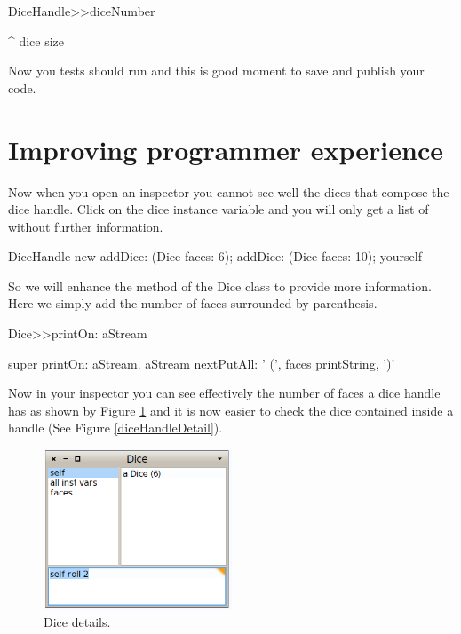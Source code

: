 \documentclass[a4paper,10pt,twoside]{book}
\begin{document}
\begin{code}{}
DiceHandle>>diceNumber  

	^ dice size
\end{code}


Now you tests should run and this is good moment to save and publish your code. 
\section{ Improving programmer experience}
Now when you open an inspector you cannot see well the dices that compose the dice handle. Click on the dice instance variable and you will only get a list of  without further information. 


\begin{code}{}
DiceHandle new 
	addDice: (Dice faces: 6);
	addDice: (Dice faces: 10);
	yourself
\end{code}


So we will enhance the  method of the Dice class to provide more information. Here we simply add the number of faces surrounded by parenthesis.


\begin{code}{}
Dice>>printOn: aStream

	super printOn: aStream.
	aStream nextPutAll: ' (', faces printString, ')'
\end{code}


Now in your inspector you can see effectively the number of faces a dice handle has as shown by Figure \ref{diceDetail} and it is now easier to check the dice contained inside a handle (See Figure \ref{diceHandleDetail}).


\begin{figure}

\begin{center}
\includegraphics[width=0.5\textwidth]{figures/DiceDetail.png}\caption{Dice details.\label{diceDetail}}\end{center}
\end{figure}
 
\end{document}
